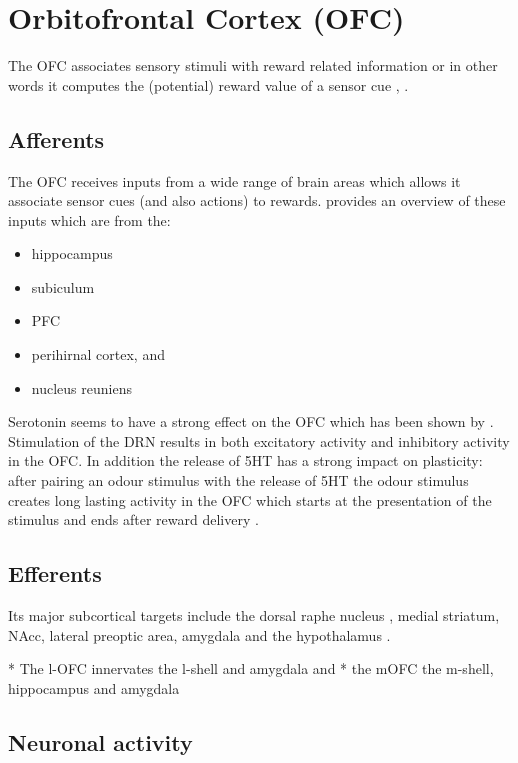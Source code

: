 \documentclass[12pt,a4paper]{article}
\begin{document}
\section{Orbitofrontal Cortex (OFC)}

The OFC associates sensory stimuli with reward related information \citep{Schoenbaum.2009} or in other words it computes the (potential) reward value of a sensor cue \citep{Wikenheiser2016}, \citep{Bari2013}.

\subsection{Afferents}

The OFC receives inputs from a wide range of brain areas which allows it associate sensor cues (and also actions) to rewards. \citep{Wikenheiser2016} provides an overview of these inputs which are from the:

\begin{itemize}
\item hippocampus
\item subiculum
\item PFC
\item perihirnal cortex, and
\item nucleus reuniens
\end{itemize}

Serotonin seems to have a strong effect on the OFC which has been shown by \citep{Zhou2015}. Stimulation of the DRN results in both excitatory activity and inhibitory activity in the OFC. In addition the release of 5HT has a strong impact on plasticity: after pairing an odour stimulus with the release of 5HT the odour stimulus creates long lasting activity in the OFC which starts at the presentation of the stimulus and ends after reward delivery  \citep{Zhou2015}.

\subsection{Efferents}

Its major subcortical targets include the dorsal raphe nucleus \citep{Luo2015}, medial striatum, NAcc, lateral preoptic area, amygdala and the hypothalamus \citep{Vertes2012}.

  * The l-OFC innervates the l-shell and amygdala and 
  * the mOFC the m-shell, hippocampus and amygdala \citep{Brog1993} \citep{Noonan2012}

\subsection{Neuronal activity}
\end{document}
